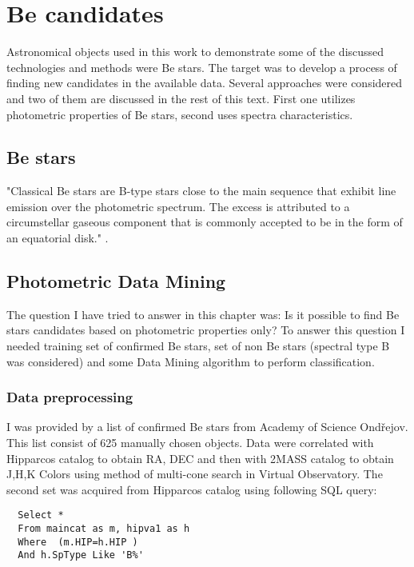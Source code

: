 \chapter{Be candidates}
Astronomical objects used in this work to demonstrate some of the
discussed technologies and methods were Be stars. The target was to
develop a process of finding new candidates in the available
data. Several approaches were considered and two of them are discussed
in the rest of this text. First one utilizes photometric properties
of Be stars, second uses spectra characteristics.


\section{Be stars}

"Classical Be stars are B-type stars close to the main sequence that
exhibit line emission over the photometric spectrum. The excess is
attributed to a circumstellar gaseous component that is commonly
accepted to be in the form of an equatorial disk."
\cite{porter2003classical}.

\section{Photometric Data Mining}

The question I have tried to answer in this chapter was: Is it
possible to find Be stars candidates based on photometric properties
only? To answer this question I needed training set of confirmed Be
stars, set of non Be stars (spectral type B was considered) and some
Data Mining algorithm to perform classification.

\subsection{Data preprocessing}

I was provided by a list of confirmed Be stars from Academy of Science
Ondřejov. This list consist of 625 manually chosen objects. Data were
correlated with Hipparcos \cite{perryman1997hipparcos} catalog to
obtain RA, DEC and then with 2MASS\cite{2006AJ131.1163S} catalog to
obtain J,H,K Colors using method of multi-cone search in Virtual
Observatory. The second set was acquired from Hipparcos catalog using
following SQL query:

\begin{lstlisting}
  Select * 
  From maincat as m, hipva1 as h 
  Where  (m.HIP=h.HIP )  
  And h.SpType Like 'B%'
\end{lstlisting}

